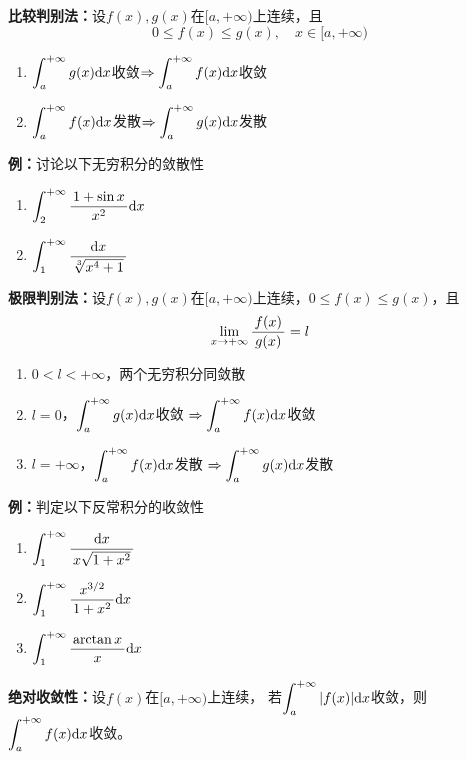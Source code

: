 \begin{thx}
	{\bf 比较判别法：}设$f(x),g(x)$在$[a,+\infty)$上连续，且
	$$0\leq f(x)\leq g(x),\quad x\in[a,+\infty)$$ 
	\begin{enumerate}[(1)]
	  \item
	  $\displaystyle\int_a^{+\infty}g(x)\mathrm{d} x$收敛$\Rightarrow\displaystyle\int_a^{+\infty}f(x)\mathrm{d} x$收敛 
	  \item $\displaystyle\int_a^{+\infty}f(x)\mathrm{d} x$发散$\Rightarrow\displaystyle\int_a^{+\infty}g(x)\mathrm{d} x$发散
	\end{enumerate}
\end{thx}

{\bf 例：}讨论以下无穷积分的敛散性
\begin{enumerate}[(1)]
  \setlength{\itemindent}{1cm}
  \item $\displaystyle\int_2^{+\infty}\displaystyle\frac{\,{1+\sin x}\,}{\,{x^2}\,}\mathrm{d} x$ 
  \item $\displaystyle\int_1^{+\infty}\displaystyle\frac{\,{\mathrm{d} x}\,}{\,{\sqrt[3]{x^4+1}}\,}$
\end{enumerate}

\begin{thx}
	{\bf 极限判别法：}设$f(x),g(x)$在$[a,+\infty)$上连续，$0\leq f(x)\leq g(x)$，且
	$$\lim\limits_{x\to{+\infty}}\displaystyle\frac{\,{f(x)}\,}{\,{g(x)}\,}=l$$ 
	\begin{enumerate}[(1)]
	  \item $0<l<+\infty$，两个无穷积分同敛散 
	  \item
	  $l=0$，$\displaystyle\int_a^{+\infty}g(x)\mathrm{d} x$收敛
	  $\Rightarrow\displaystyle\int_a^{+\infty}f(x)\mathrm{d} x$收敛 
	  \item
	  $l=+\infty$，$\displaystyle\int_a^{+\infty}f(x)\mathrm{d} x$发散
	  $\Rightarrow\displaystyle\int_a^{+\infty}g(x)\mathrm{d} x$发散
	\end{enumerate}
\end{thx}

{\bf 例：}判定以下反常积分的收敛性
\begin{enumerate}[(1)]
  \setlength{\itemindent}{1cm}
  \item $\displaystyle\int_1^{+\infty}\displaystyle\frac{\,{\mathrm{d} x}\,}{\,{x\sqrt{1+x^2}}\,}$ 
  \item $\displaystyle\int_1^{+\infty}\displaystyle\frac{\,{x^{3/2}}\,}{\,{1+x^2}\,}\mathrm{d} x$ 
  \item $\displaystyle\int_1^{+\infty}\displaystyle\frac{\,{\arctan x}\,}{\,{x}\,}\mathrm{d} x$
\end{enumerate}

\begin{thx}
	{\bf 绝对收敛性：}设$f(x)$在$[a,+\infty)$上连续，
	若$\displaystyle\int_a^{+\infty}|f(x)|\mathrm{d} x$收敛，则
	$\displaystyle\int_a^{+\infty}f(x)\mathrm{d} x$收敛。
\end{thx}


